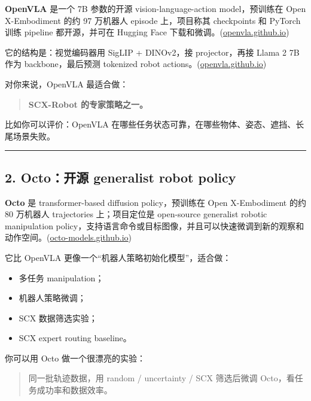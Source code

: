 \documentclass[
  12pt,
]{ctexart}
\providecommand{\tightlist}{%
  \setlength{\itemsep}{0pt}\setlength{\parskip}{0pt}}
\begin{document}
\textbf{OpenVLA} 是一个 7B 参数的开源 vision-language-action
model，预训练在 Open X-Embodiment 的约 97 万机器人 episode 上，项目称其
checkpoints 和 PyTorch 训练 pipeline 都开源，并可在 Hugging Face
下载和微调。(\href{https://next-gen.materialsproject.org/api?utm_source=chatgpt.com}{openvla.github.io})

它的结构是：视觉编码器用 SigLIP + DINOv2，接 projector，再接 Llama 2 7B
作为 backbone，最后预测 tokenized robot
actions。(\href{https://next-gen.materialsproject.org/api?utm_source=chatgpt.com}{openvla.github.io})

对你来说，OpenVLA 最适合做：

\begin{quote}
\textbf{SCX-Robot 的专家策略之一。}
\end{quote}

比如你可以评价：OpenVLA
在哪些任务状态可靠，在哪些物体、姿态、遮挡、长尾场景失败。

\begin{center}\rule{0.5\linewidth}{0.5pt}\end{center}

\subsection{2. Octo：开源 generalist robot
policy}\label{octoux5f00ux6e90-generalist-robot-policy}

\textbf{Octo} 是 transformer-based diffusion policy，预训练在 Open
X-Embodiment 的约 80 万机器人 trajectories 上；项目定位是 open-source
generalist robotic manipulation
policy，支持语言命令或目标图像，并且可以快速微调到新的观察和动作空间。(\href{https://next-gen.materialsproject.org/synthesis?utm_source=chatgpt.com}{octo-models.github.io})

它比 OpenVLA 更像一个``机器人策略初始化模型''，适合做：

\begin{itemize}
\tightlist
\item
  多任务 manipulation；
\item
  机器人策略微调；
\item
  SCX 数据筛选实验；
\item
  SCX expert routing baseline。
\end{itemize}

你可以用 Octo 做一个很漂亮的实验：

\begin{quote}
同一批轨迹数据，用 random / uncertainty / SCX 筛选后微调
Octo，看任务成功率和数据效率。
\end{quote}
\end{document}
